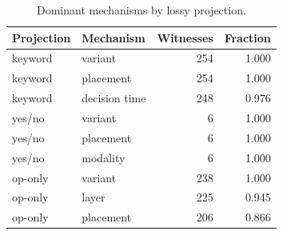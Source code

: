 \begin{table}[H]
\centering
\caption{Dominant mechanisms by lossy projection.}
\label{tab:mechanism-by-projection}
\footnotesize
\begin{tabular}{p{}p{}rr}
\toprule
Projection & Mechanism & Witnesses & Fraction \\
\midrule
keyword & variant & 254 & 1.000 \\
keyword & placement & 254 & 1.000 \\
keyword & decision time & 248 & 0.976 \\
yes/no & variant & 6 & 1.000 \\
yes/no & placement & 6 & 1.000 \\
yes/no & modality & 6 & 1.000 \\
op-only & variant & 238 & 1.000 \\
op-only & layer & 225 & 0.945 \\
op-only & placement & 206 & 0.866 \\
\bottomrule
\end{tabular}
\end{table}
